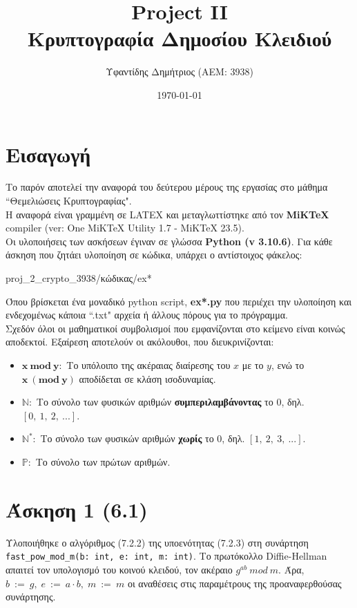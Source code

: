 \documentclass[12pt]{article}
\title{\textbf{{\lt Project II} \\ Κρυπτογραφία Δημοσίου Κλειδιού}}
\author{Υφαντίδης Δημήτριος (ΑΕΜ: 3938)}
\date{\today}
\newcommand{\lt}{\latintext}
\begin{document}
\maketitle

\section*{Εισαγωγή}

Το παρόν αποτελεί την αναφορά του δεύτερου μέρους της εργασίας 
στο μάθημα {\lt ``}Θεμελιώσεις Κρυπτογραφίας{\lt "}. \\

\vspace{0.2cm}
\noindent
Η αναφορά είναι γραμμένη σε {\lt LATEX} και μεταγλωττίστηκε 
από τον {\lt \textbf{MiKTeX} compiler (ver: One MiKTeX Utility 1.7 - MiKTeX 23.5)}. \\

\vspace{0.2cm}
\noindent
Οι υλοποιήσεις των ασκήσεων έγιναν σε γλώσσα 
\textbf{\lt Python (v 3.10.6)}. Για κάθε άσκηση που 
ζητάει υλοποίηση σε κώδικα, υπάρχει ο αντίστοιχος φάκελος:
\begin{center}
{\lt proj\_2\_crypto\_3938}/κώδικας/{\lt ex*}
\end{center}
Όπου βρίσκεται ένα μοναδικό {\lt python script, 
\textbf{ex*.py}} που περιέχει την υλοποίηση και ενδεχομένως 
κάποια {\lt ``.txt"} αρχεία ή άλλους πόρους για το πρόγραμμα. \\


\vspace{0.2cm}
\noindent
Σχεδόν όλοι οι μαθηματικοί συμβολισμοί που εμφανίζονται 
στο κείμενο είναι κοινώς αποδεκτοί. Εξαίρεση αποτελούν 
οι ακόλουθοι, που διευκρινίζονται:
\begin{itemize}
	\item $\mathbf{x\:mod\:y:}$ Το υπόλοιπο της ακέραιας διαίρεσης του $x$ με το $y$, ενώ το
	$\mathbf{x\:(mod\:y)}$ αποδίδεται σε κλάση ισοδυναμίας.
	\item $\mathbf{\mathbb{N}}:$ Το σύνολο των φυσικών αριθμών \textbf{συμπεριλαμβάνοντας} το 0, δηλ. $[0,\:1,\:2,\:...]$.
	\item $\mathbf{\mathbb{N}^{*}}:$ Το σύνολο των φυσικών αριθμών \textbf{χωρίς} το 0, δηλ. $[1,\:2,\:3,\:...]$.
	\item $\mathbf{\mathbb{P}}:$ Το σύνολο των πρώτων αριθμών.
\end{itemize}

\pagebreak

\section*{Άσκηση 1 (6.1)}
\indent
Υλοποιήθηκε ο αλγόριθμος (7.2.2) της υποενότητας (7.2.3) 
στη συνάρτηση 
\texttt{\lt fast\_pow\_mod\_m(b: int, e: int, m: int)}. 
Το πρωτόκολλο {\lt Diffie-Hellman} απαιτεί τον υπολογισμό 
του κοινού κλειδού, τον ακέραιο $g^{ab}\: mod\: m$. 
Άρα, $b\: :=\:g,\; e\: :=\:a\cdot b,\; m\: :=\:m$ οι αναθέσεις 
στις παραμέτρους της προαναφερθούσας συνάρτησης.  \\
\end{document}
